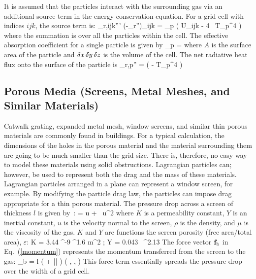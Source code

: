 It is assumed that the particles interact with the surrounding gas via an additional source term in the energy conservation
equation. For a grid cell with indices $ijk$, the source term is:
\be \dq_{{\rm r},ijk}''' \equiv (-\nabla \cdot \dot{\bq}_{\rm r}'')_{ijk} = \sum \kappa_{\rm p} \left( U_{ijk} - 4 \sigma \, T_{\rm p}^4 \right) \ee
where the summation is over all the particles within the cell. The effective absorption coefficient for a single particle is given by
\be \kappa_{\rm p} =  \ee
where $A$ is the surface area of the particle and $\delta x \, \delta y \, \delta z$ is the volume of the cell.
The net radiative heat flux onto the surface of the particle is
\be \dq_{\rm r,p}'' = \epsilon \left(  - \sigma T_{\rm p}^4 \right) \ee

\subsection{Porous Media (Screens, Metal Meshes, and Similar Materials)}

Catwalk grating, expanded metal mesh, window screens, and similar thin porous materials are commonly found in buildings.  For a typical calculation, the dimensions of the holes in the porous material and the material surrounding them are going to be much smaller than the grid size.  There is, therefore, no easy way to model these materials using solid obstructions. Lagrangian particles can; however, be used to represent both the drag and the mass of these materials. Lagrangian particles arranged in a plane can represent a window screen, for example. By modifying the particle drag law, the particles can impose drag appropriate for a thin porous material.  The pressure drop across a screen of thickness $l$ is given by~\cite{Bartzanas:1}:
\be
    =   u + \rho {} \, u^2
\ee
where $K$ is a permeability constant, $Y$ is an inertial constant, $u$ is the velocity normal to the screen, $\rho$ is the density, and $\mu$ is the viscosity of the gas.  $K$ and $Y$ are functions the screen porosity (free area/total area), $\varepsilon$:
\be
   K = 3.44 ^{-9} \; \varepsilon^{1.6} \; \; \hbox{m}^2 \quad ; \quad Y = 0.043 \, \varepsilon^{2.13}
\ee
The force vector ${\mathbf{f}}_{\rm b}$ in Eq.~(\ref{momentum}) represents the momentum transferred from the screen to the gas:
\be
   \bof_{\rm b} = l \; \left(  + \rho {} |\bu| \right) \left(  ,  ,  \right)
\ee
This force term essentially spreads the pressure drop over the width of a grid cell.




